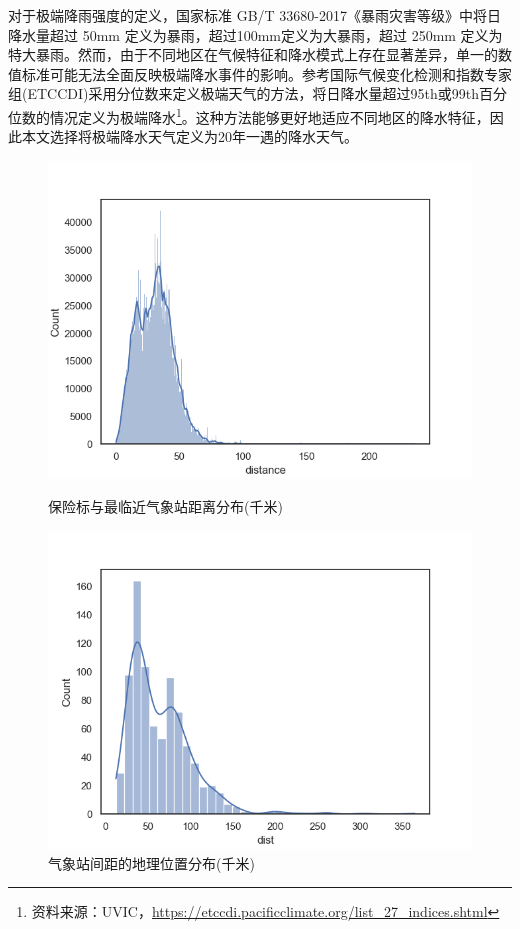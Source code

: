 对于极端降雨强度的定义，国家标准 GB/T 33680-2017《暴雨灾害等级》中将日降水量超过 50mm 定义为暴雨，超过100mm定义为大暴雨，超过 250mm 定义为特大暴雨。然而，由于不同地区在气候特征和降水模式上存在显著差异，单一的数值标准可能无法全面反映极端降水事件的影响。参考国际气候变化检测和指数专家组(ETCCDI)采用分位数来定义极端天气的方法，将日降水量超过95th或99th百分位数的情况定义为极端降水\footnote{资料来源：UVIC，\url{https://etccdi.pacificclimate.org/list_27_indices.shtml}}。这种方法能够更好地适应不同地区的降水特征\citep{karl1999clivar}，因此本文选择将极端降水天气定义为20年一遇的降水天气。
\begin{figure}[H]
    \begin{minipage}{0.48\linewidth}
        \centering
        \includegraphics[width=\textwidth]{lib/img/distance.png}
        \caption{保险标与最临近气象站距离分布(千米)}
        \label{fig:distance}
    \end{minipage}
    \begin{minipage}{0.48\linewidth}
        \centering
        \includegraphics[width=\textwidth]{lib/img/locations_distance.png}
        \caption{气象站间距的地理位置分布(千米)}
        \label{fig:locations}
    \end{minipage}
\end{figure}

